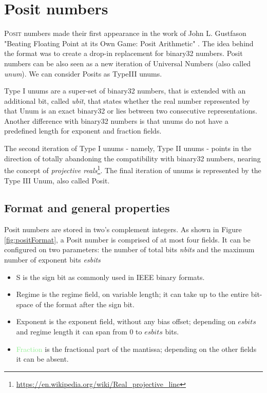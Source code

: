 \chapter{Posit numbers}\label{chap:posit_num}


\lettrine{P}{osit} numbers made their first appearance in the work of John L. Gustfason "Beating Floating Point at its Own Game: Posit Arithmetic" \cite{gustafson2017beating}. The idea behind the format was to create a drop-in replacement for binary32 numbers. Posit numbers can be also seen as a new iteration of Universal Numbers (also called \textit{unum}). We can consider Posits as TypeIII unums.


Type I unums are a super-set of binary32 numbers, that is extended with an additional bit, called \textit{ubit}, that states whether the real number represented by that Unum is an exact binary32 or lies between two consecutive representations. Another difference with binary32 numbers is that unums do not have a predefined length for exponent and fraction fields. 

The second iteration of Type I unums - namely, Type II unums - points in the direction of totally abandoning the compatibility with binary32 numbers, nearing the concept of \textit{projective reals}\footnote{\url{https://en.wikipedia.org/wiki/Real_projective_line}}. The final iteration of unums is represented by the Type III Unum, also called Posit.


\section{Format and general properties}

Posit numbers are stored in two's complement integers. As shown in Figure \ref{fig:positFormat}, a Posit number is comprised of at most four fields. It can be configured on two parameters: the number of total bits \textit{nbits} and the maximum number of exponent bits \textit{esbits}
\begin{itemize}
    \item  \textcolor{asparago}{S} is the sign bit as commonly used in IEEE binary formats.
    \item \textcolor{amber}{Regime} is the regime field, on variable length; it can take up to the entire bit-space of the format after the sign bit.
    \item \textcolor{lightred}{Exponent} is the exponent field, without any bias offset; depending on $esbits$ and regime length it can span from $0$ to $esbits$ bits.
    \item \textcolor{lightgreen}{Fraction} is the fractional part of the mantissa; depending on the other fields it can be absent.
\end{itemize}


